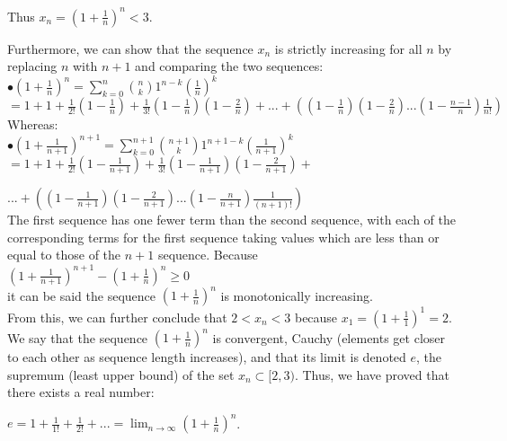 \documentclass[12pt]{article}
\begin{document}
Thus $x_n = (1+\frac{1}{n})^n < 3$.\\

\newpage

Furthermore, we can show that the sequence ${x_n}$ is strictly increasing for all $n$ by replacing $n$ with $n+1$ and comparing the two sequences:\\

$\bullet (1+\frac{1}{n})^n = \sum_{k=0}^n \binom{n}{k} 1^{n-k} (\frac{1}{n})^k$\\

$=  1 + 1 + \frac{1}{2!}(1-\frac{1}{n}) + \frac{1}{3!}(1-\frac{1}{n})(1-\frac{2}{n}) + ... + ((1-\frac{1}{n})(1-\frac{2}{n})...(1-\frac{n-1}{n})\frac{1}{n!})$\\

Whereas:\\

$\bullet (1+\frac{1}{n+1})^{n+1} = \sum_{k=0}^{n+1} \binom{n+1}{k} 1^{n+1-k} (\frac{1}{n+1})^k$\\

$=  1 + 1 + \frac{1}{2!}(1-\frac{1}{n+1}) + \frac{1}{3!}(1-\frac{1}{n+1})(1-\frac{2}{n+1}) + $

$... + ((1-\frac{1}{n+1})(1-\frac{2}{n+1})...(1-\frac{n}{n+1})\frac{1}{(n+1)!})$\\

The first sequence has one fewer term than the second sequence, with each of the corresponding terms for the first sequence taking values which are less than or equal to those of the $n+1$ sequence. Because\\

$(1+\frac{1}{n+1})^{n+1} - (1+\frac{1}{n})^n \geq 0$\\

it can be said the sequence $(1+\frac{1}{n})^n$ is monotonically increasing.\\

From this, we can further conclude that $2 < x_n < 3$ because $x_1 = (1+ \frac{1}{1})^1 = 2$.\\

We say that the sequence  $(1+ \frac{1}{n})^n$ is convergent, Cauchy (elements get closer to each other as sequence length increases), and that its limit is denoted $e$, the supremum (least upper bound) of the set ${x_n} \subset [2,3)$. Thus, we have proved that there exists a real number:

$e = 1 + \frac{1}{1!} +  \frac{1}{2!} + ... = \lim_{n \rightarrow \infty} (1 + \frac{1}{n})^n$.\\
\end{document}
